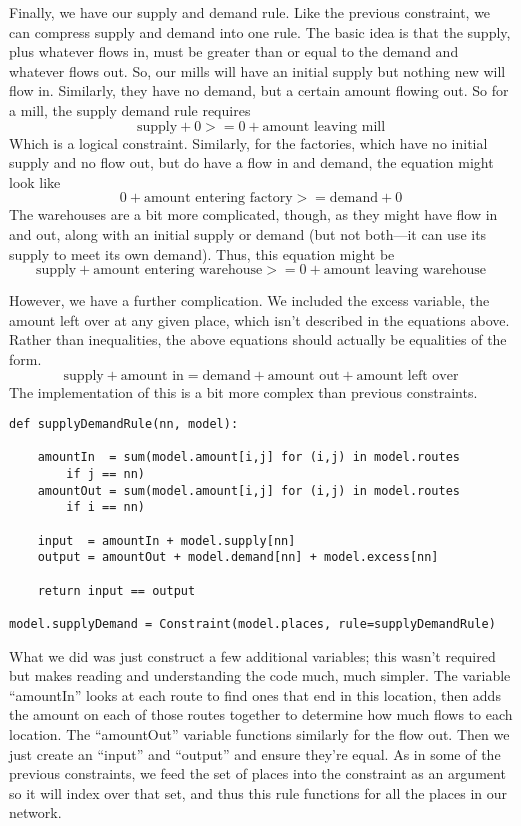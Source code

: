 \documentclass{article}
\begin{document}
Finally, we have our supply and demand rule.  Like the previous constraint, we can compress supply and demand into one rule.  The basic idea is that the supply, plus whatever flows in, must be greater than or equal to the demand and whatever flows out.  So, our mills will have an initial supply but nothing new will flow in.  Similarly, they have no demand, but a certain amount flowing out.  So for a mill, the supply demand rule requires
$$\textrm{supply} + 0 >= 0 + \textrm{amount leaving mill}$$
Which is a logical constraint.  Similarly, for the factories, which have no initial supply and no flow out, but do have a flow in and demand, the equation might look like
$$0 + \textrm{amount entering factory} >= \textrm{demand} +0$$
The warehouses are a bit more complicated, though, as they might have flow in and out, along with an initial supply or demand (but not both---it can use its supply to meet its own demand).  Thus, this equation might be
$$\textrm{supply} +\textrm{amount entering warehouse} >= 0 + \textrm{amount leaving warehouse}$$

However, we have a further complication.  We included the excess variable, the amount left over at any given place, which isn't described in the equations above.  Rather than inequalities, the above equations should actually be equalities of the form.
$$\textrm{supply} +\textrm{amount in} = \textrm{demand} +\textrm{amount out} +\textrm{amount left over}$$
The implementation of this is a bit more complex than previous constraints.

\begin{verbatim}
def supplyDemandRule(nn, model):
    
    amountIn  = sum(model.amount[i,j] for (i,j) in model.routes 
        if j == nn)
    amountOut = sum(model.amount[i,j] for (i,j) in model.routes 
        if i == nn)
    
    input  = amountIn + model.supply[nn]
    output = amountOut + model.demand[nn] + model.excess[nn]
    
    return input == output

model.supplyDemand = Constraint(model.places, rule=supplyDemandRule)
\end{verbatim}

What we did was just construct a few additional variables; this wasn't required but makes reading and understanding the code much, much simpler.  The variable ``amountIn'' looks at each route to find ones that end in this location, then adds the amount on each of those routes together to determine how much flows to each location.  The ``amountOut'' variable functions similarly for the flow out.  Then we just create an ``input'' and ``output'' and ensure they're equal.  As in some of the previous constraints, we feed the set of places into the constraint as an argument so it will index over that set, and thus this rule functions for all the places in our network.
\end{document}
